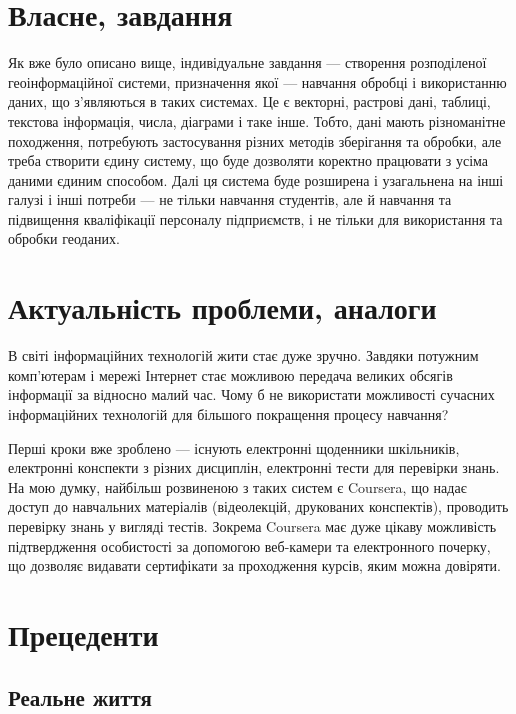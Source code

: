 \section{Власне, завдання}
Як вже було описано вище, індивідуальне завдання --- створення розподіленої
геоінформаційної системи, призначення якої --- навчання обробці і використанню
даних, що з’являються в таких системах.
Це є векторні, растрові дані, таблиці, текстова інформація, числа, діаграми
і таке інше.
Тобто, дані мають різноманітне походження, потребують застосування різних
методів зберігання та обробки, але треба створити єдину систему, що буде
дозволяти коректно працювати з усіма даними єдиним способом.
Далі ця система буде розширена і узагальнена на інші галузі і інші потреби
--- не тільки навчання студентів, але й навчання та підвищення кваліфікації
персоналу підприємств, і не тільки для використання та обробки геоданих.

\section{Актуальність проблеми, аналоги}
В світі інформаційних технологій жити стає дуже зручно.
Завдяки потужним комп’ютерам і мережі Інтернет стає можливою передача великих
обсягів інформації за відносно малий час.
Чому б не використати можливості сучасних інформаційних технологій для більшого
покращення процесу навчання?

Перші кроки вже зроблено --- існують електронні щоденники шкільників,
електронні конспекти з різних дисциплін, електронні тести для перевірки знань.
На мою думку, найбільш розвиненою з таких систем є Coursera, що надає доступ
до навчальних матеріалів (відеолекцій, друкованих конспектів), проводить
перевірку знань у вигляді тестів. Зокрема Coursera має дуже цікаву можливість
підтвердження особистості за допомогою веб-камери та електронного почерку, що
дозволяє видавати сертифікати за проходження курсів, яким можна довіряти.

\section{Прецеденти}

\subsection{Реальне життя}

